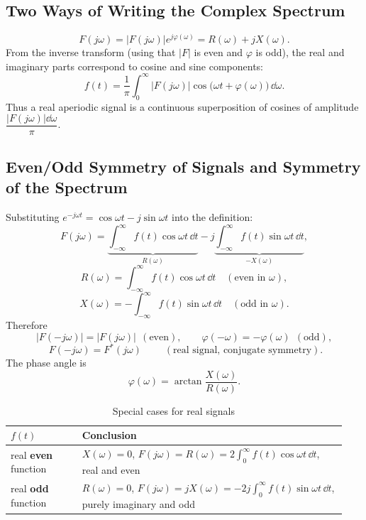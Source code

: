 \subsection{Two Ways of Writing the Complex Spectrum}

\[
    F(j\omega)=|F(j\omega)|e^{j\varphi(\omega)}=R(\omega)+jX(\omega).
\]
From the inverse transform (using that $|F|$ is even and $\varphi$ is odd),
the real and imaginary parts correspond to cosine and sine components:
\[
    f(t)=\frac{1}{\pi}\int_0^{\infty}|F(j\omega)|\cos\bigl(\omega t+\varphi(\omega)\bigr)\,\dd\omega .
\]
Thus a real aperiodic signal is a continuous superposition of cosines of
amplitude $\dfrac{|F(j\omega)|\dd\omega}{\pi}$.

\subsection{Even/Odd Symmetry of Signals and Symmetry of the Spectrum}

Substituting $e^{-j\omega t}=\cos\omega t-j\sin\omega t$ into the definition:
\[
    F(j\omega)=\underbrace{\int_{-\infty}^{\infty}f(t)\cos\omega t\,\dd t}_{R(\omega)}
    -j\underbrace{\int_{-\infty}^{\infty}f(t)\sin\omega t\,\dd t}_{-X(\omega)},
\]
\[
    R(\omega)=\int_{-\infty}^{\infty}f(t)\cos\omega t\,\dd t
    \quad(\text{even in }\omega),
\]
\[
    X(\omega)=-\int_{-\infty}^{\infty}f(t)\sin\omega t\,\dd t
    \quad(\text{odd in }\omega).
\]
Therefore
\[
    |F(-j\omega)|=|F(j\omega)|\ \ (\text{even}),\qquad
    \varphi(-\omega)=-\varphi(\omega)\ \ (\text{odd}),
\]
\[
    \boxed{\;F(-j\omega)=F^{*}(j\omega)\;}\qquad(\text{real signal, conjugate symmetry}).
\]
The phase angle is
\[
    \varphi(\omega)=\arctan\frac{X(\omega)}{R(\omega)} .
\]

\begin{table}[htbp]
\centering
\caption{Special cases for real signals}
\small
\begin{tabular}{@{}p{0.20\linewidth}p{0.74\linewidth}@{}}
\toprule
$f(t)$ & Conclusion \\
\midrule
real \textbf{even} function & $X(\omega)=0$,
$F(j\omega)=R(\omega)=2\displaystyle\int_0^{\infty}f(t)\cos\omega t\,\dd t$,
real and even \\
real \textbf{odd} function & $R(\omega)=0$,
$F(j\omega)=jX(\omega)=-2j\displaystyle\int_0^{\infty}f(t)\sin\omega t\,\dd t$,
purely imaginary and odd \\
\bottomrule
\end{tabular}
\end{table}

